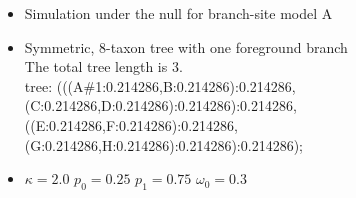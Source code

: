 \documentclass[12pt,letterpaper]{article}\usepackage[]{graphicx}\usepackage[]{color}
\newenvironment{knitrout}{}{} %
\begin{document}
\begin{itemize}
\item Simulation under the null for branch-site model A
\item Symmetric, 8-taxon tree with one foreground branch \\
  The total tree length is 3.\\
  tree: (((A\#1:0.214286,B:0.214286):0.214286,(C:0.214286,D:0.214286):0.214286):0.214286,\\((E:0.214286,F:0.214286):0.214286,(G:0.214286,H:0.214286):0.214286):0.214286);
\item $\kappa=2.0$ $p_0=0.25$ $p_{1}=0.75$ $\omega_0=0.3$
\end{itemize}

\begin{knitrout}
\color{fgcolor}


\end{knitrout}
\end{document}
